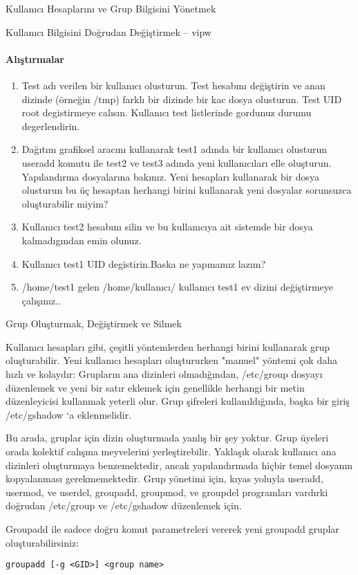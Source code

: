 \begin{section}{Kullanıcı Hesaplarını ve Grup Bilgisini Yönetmek}
\begin{subsection}{Kullanıcı Bilgisini Doğrudan Değiştirmek -- vipw}
\paragraph{{\Huge{\PencilLeftDown}}Alıştırmalar}{
\begin{enumerate}
\item Test adı verilen bir kullanıcı olusturun. Test hesabını değiştirin ve anan dizinde (örneğin /tmp) farklı bir dizinde bir kac dosya olusturun. Test UID root degistirmeye calısın. Kullanıcı test listlerinde gordunuz durumu degerlendirin.
\item Dağıtım grafiksel aracını kullanarak test1 adında bir kullanıcı olusturun useradd komutu ile test2 ve test3 adında yeni kullanıcıları elle oluşturun. Yapılandırma dosyalarına bakınız. Yeni hesapları kullanarak bir dosya olusturun bu üç hesaptan herhangi birini kullanarak yeni dosyalar sorunsuzca oluşturabilir miyim?
\item Kullanıcı test2 hesabını silin ve bu kullanıcıya ait sistemde bir dosya kalmadıgından emin olunuz.
\item Kullanıcı test1 UID degistirin.Baska ne yapmamız lazım?
\item /home/test1 gelen /home/kullanıcı/ kullanıcı test1 ev dizini değiştirmeye çalışınız..
\end{enumerate}}
\end{subsection}
\begin{subsection}{Grup Oluşturmak, Değiştirmek ve Silmek}

Kullanıcı hesapları gibi, çeşitli yöntemlerden herhangi birini kullanarak grup oluşturabilir. Yeni kullanıcı hesapları oluştururken "manuel" yöntemi çok daha hızlı ve kolaydır: Grupların ana dizinleri olmadığından, /etc/group dosyayı düzenlemek ve yeni bir satır eklemek için genellikle herhangi bir metin düzenleyicisi kullanmak yeterli olur. Grup şifreleri kullanıldığında, başka bir giriş /etc/gshadow ‘a eklenmelidir.

Bu arada, gruplar için dizin oluşturmada yanlış bir şey yoktur. Grup üyeleri orada kolektif calışma meyvelerini yerleştirebilir. Yaklaşık olarak kullanıcı ana dizinleri oluşturmaya benzemektedir, ancak yapılandırmada hiçbir temel dosyanın kopyalanması gerekmemektedir. Grup yönetimi için, kıyas yoluyla useradd, usermod, ve userdel, groupadd, groupmod, ve groupdel programları vardırki doğrudan /etc/group ve /etc/gshadow düzenlemek için.

Groupadd ile sadece doğru komut parametreleri vererek yeni groupadd gruplar oluşturabilirsiniz:
\begin{verbatim}
groupadd [-g <GID>] <group name>
\end{verbatim}


\end{subsection}
\end{section}
